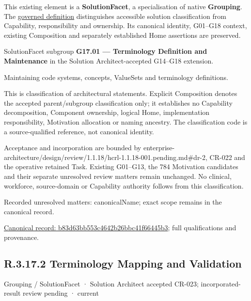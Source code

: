 This existing element is a \textbf{SolutionFacet}, a specialisation of native
\textbf{Grouping}. The \href{\detokenize{../../../../../../../governance/continuum-representation.md#solutionfacet-classification--1119-candidate}}{governed definition}
distinguishes accessible solution classification from Capability, responsibility
and ownership. Its canonical identity, G01–G18 context, existing Composition
and separately established Home assertions are preserved.



SolutionFacet subgroup \textbf{G17.01 — Terminology Definition and Maintenance} in the Solution Architect-accepted G14–G18 extension.



Maintaining code systems, concepts, ValueSets and terminology definitions.



This is classification of architectural statements. Explicit Composition denotes the accepted parent/subgroup classification only; it establishes no Capability decomposition, Component ownership, logical Home, implementation responsibility, Motivation allocation or naming ancestry. The classification code is a source-qualified reference, not canonical identity.



Acceptance and incorporation are bounded by enterprise-architecture/design/review/1.1.18/hcrl-1.1.18-001.pending.md\#dr-2, CR-022 and the operative retained Task. Existing G01–G13, the 784 Motivation candidates and their separate unresolved review matters remain unchanged. No clinical, workforce, source-domain or Capability authority follows from this classification.


{\small Recorded unresolved matters: canonicalName; exact scope remains in the canonical record.}\par
{\footnotesize \href{../../../../../../../continuum/grouping/b83d63bb553c4642b26bbc41f66445b3.md}{Canonical record: b83d63bb553c4642b26bbc41f66445b3}; full qualifications and provenance.}\par
\subsection*{R.3.17.2 Terminology Mapping and Validation}
\label{navigation:R.3.17.2}

\label{element:8655d81cd41647449c3b1a10ffd453b3}
{\small Grouping / SolutionFacet · Solution Architect accepted CR-023; incorporated-result review pending · current}\par

